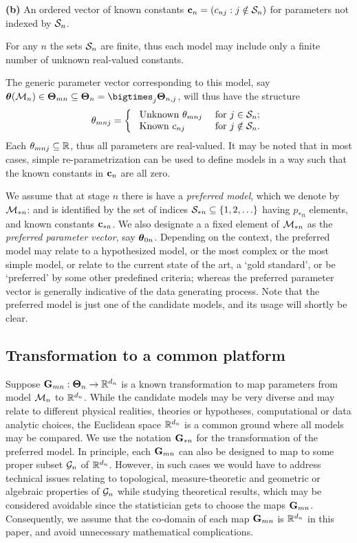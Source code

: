 \noindent\textbf{(b)} An ordered vector of  known constants ${\bf{c}}_{n} = (c_{nj}: j \notin {\cal{S}}_{n})$ for  parameters not indexed by ${\cal{S}}_{n}$.

\vspace{1em}
\noindent For any $n$ the sets ${\cal{S}}_{n}$ are finite, thus each model may include only a finite number of unknown real-valued constants.

The generic parameter vector corresponding to this model, say $\bftheta (\cM_n) \in \bfTheta_{m n} \subseteq \bfTheta_n  = \bigtimes_j \bfTheta_{n,j}$, will thus have the structure
%
\begin{align*}
\theta_{m n j} = \left\{ \begin{array}{ll}
\text{ Unknown } \theta_{m n j} & \text{ for } 
			j \in {\cal{S}}_{n}; \\
\text{ Known } c_{nj} & \text{ for } j \notin {\cal{S}}_{n}.
\end{array}
\right.
\end{align*}
%
Each $\theta_{m n j} \subseteq {\mathbb{R}}$, thus all parameters are real-valued. It may be noted that in most cases, simple re-parametrization can be used to define models in a way such that the known constants in ${\bf{c}}_n$ are all zero.

We assume that at stage $n$ there is have a {\it preferred model}, which we denote by ${\cal{M}}_{*n}$: and is identified by the set of indices ${\cal{S}}_{*n} \subseteq \{1, 2, \ldots \}$ having $p_{*n}$ elements, and known constants ${\bf{c}}_{*n}$. We also designate a a fixed element of ${\cal{M}}_{* n}$ as the \textit{preferred parameter vector}, say ${\boldsymbol{\theta}}_{0 n}$. Depending on the context, the preferred model may relate to a hypothesized model, or the most complex or the most simple model, or relate to the current state of the art, a `gold standard', or be `preferred' by some other predefined criteria; whereas the preferred parameter vector is generally indicative of the data generating process. Note that the preferred model is just one of the candidate models, and its usage will shortly be clear.

\subsection{Transformation to a common platform}
Suppose ${\mathbf{G}}_{m n} : {\boldsymbol{\Theta}}_{n} \rightarrow {\mathbb{R}}^{d_n}$ is a known transformation to map parameters from  model ${\cal{M}}_n$ to ${\mathbb{R}}^{d_n}$. While the candidate models may be very diverse and may relate to different physical realities, theories or hypotheses, computational or data analytic choices, the Euclidean space ${\mathbb{R}}^{d_{n}}$ is a common ground where all models may be compared. We use the notation ${\mathbf{G}}_{*n}$ for the transformation of the preferred model. In principle, each ${\mathbf{G}}_{mn}$ can also be designed to map to some proper subset ${\cal{G}}_n$ of ${\mathbb{R}}^{d_{n}}$. However, in such cases we would have to address technical issues relating to topological, measure-theoretic and geometric or algebraic properties of ${\cal{G}}_n$ while studying theoretical results, which may be considered avoidable  since the statistician gets to choose the maps ${\mathbf{G}}_{ m n}$. Consequently, we assume that the co-domain of each map ${\mathbf{G}}_{ m n}$ is ${\mathbb{R}}^{d_{n}}$ in this paper, and avoid unnecessary mathematical complications.

